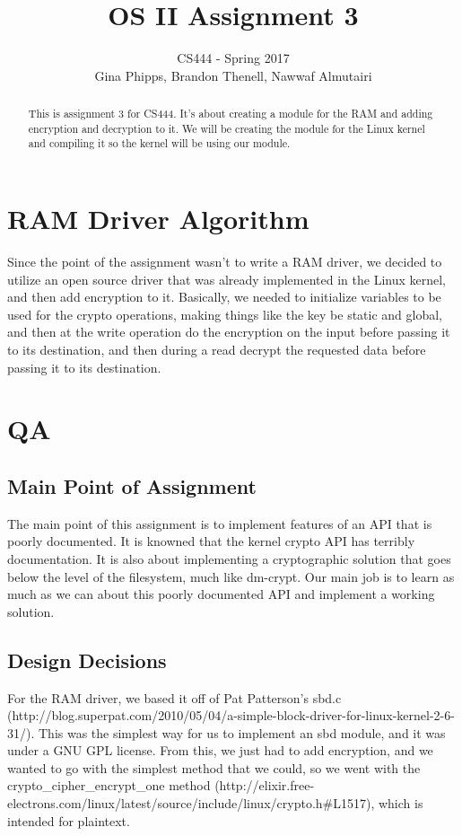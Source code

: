 \documentclass[draftclsnofoot,onecolumn,10pt]{IEEEtran}
\begin{document}
\begin{titlepage}
\title{OS II Assignment 3}
\author{CS444 - Spring 2017 \\ Gina Phipps, Brandon Thenell, Nawwaf Almutairi}
\maketitle
\begin{abstract}
	This is assignment 3 for CS444. It's about 
    creating a module for the RAM and adding encryption and 
    decryption to it. We will be creating the module for the Linux kernel
    and compiling it so the kernel will be using our module.
\end{abstract}

\thispagestyle{empty} %

\end{titlepage}

\tableofcontents

\newpage
\section{RAM Driver Algorithm}
Since the point of the assignment wasn't to write a RAM driver, we decided to utilize an open source driver that was already implemented in the Linux kernel, and then add encryption to it.  Basically, we needed to initialize variables to be used for the crypto operations, making things like the key be static and global, and then at the write operation do the encryption on the input before passing it to its destination, and then during a read decrypt the requested data before passing it to its destination.


\section{QA}
\subsection{Main Point of Assignment}
The main point of this assignment is to implement features of an API that is poorly documented. It is knowned that the kernel crypto API has terribly documentation. It is also about implementing a cryptographic solution that goes below the level of the filesystem, much like dm-crypt. Our main job is to learn as much as we can about this poorly documented API and implement a working solution.


\subsection{Design Decisions}
For the RAM driver, we based it off of Pat Patterson's sbd.c (http://blog.superpat.com/2010/05/04/a-simple-block-driver-for-linux-kernel-2-6-31/). This was the simplest way for us to implement an sbd module, and it was under a GNU GPL license. From this, we just had to add encryption, and we wanted to go with the simplest method that we could, so we went with the crypto\_cipher\_encrypt\_one method (http://elixir.free-electrons.com/linux/latest/source/include/linux/crypto.h\#L1517), which is intended for plaintext.
\end{document}
